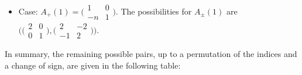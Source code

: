 \documentclass[pdftex]{sigma}
\numberwithin{equation}{section}
\theoremstyle{definition}
\begin{document}
\begin{itemize}
\item Case: $A_+(1) =
\bigl(\begin{smallmatrix}
 1 & 0 \\
 -n & 1
 \end{smallmatrix}\bigr)$.
 The possibilities for $A_\pm(1)$ are
$\bigl( \bigl(\begin{smallmatrix}
 2 & 0 \\
 0 & 1
 \end{smallmatrix}\bigr),
\bigl(\begin{smallmatrix}
 2 & -2 \\
 -1 & 2
 \end{smallmatrix}\bigr)\bigr)$.
\end{itemize}

In summary, the remaining possible pairs, up to a permutation of the indices and a change of sign,
are given in the following table:
\end{document}
